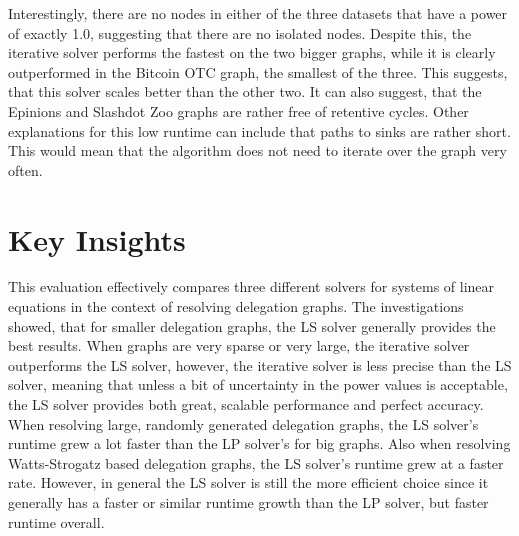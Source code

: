 Interestingly, there are no nodes in either of the three datasets that have a power of exactly 1.0, suggesting that there are no isolated nodes. Despite this, the iterative solver performs the fastest on the two bigger graphs, while it is clearly outperformed in the Bitcoin OTC graph, the smallest of the three. This suggests, that this solver scales better than the other two. It can also suggest, that the Epinions and Slashdot Zoo graphs are rather free of retentive cycles. Other explanations for this low runtime can include that paths to sinks are rather short. This would mean that the algorithm does not need to iterate over the graph very often.  

\section{Key Insights}

This evaluation effectively compares three different solvers for systems of linear equations in the context of resolving delegation graphs. The investigations showed, that for smaller delegation graphs, the LS solver generally provides the best results. When graphs are very sparse or very large, the iterative solver outperforms the LS solver, however, the iterative solver is less precise than the LS solver, meaning that unless a bit of uncertainty in the power values is acceptable, the LS solver provides both great, scalable performance and perfect accuracy. When resolving large, randomly generated delegation graphs, the LS solver's runtime grew a lot faster than the LP solver's for big graphs. Also when resolving Watts-Strogatz based delegation graphs, the LS solver's runtime grew at a faster rate. However, in general the LS solver is still the more efficient choice since it generally has a faster or similar runtime growth than the LP solver, but faster runtime overall. 